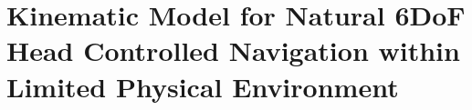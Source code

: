 \chapter{Kinematic Model for Natural 6DoF Head Controlled Navigation within Limited Physical Environment}
\label{chapter:kinematics}

